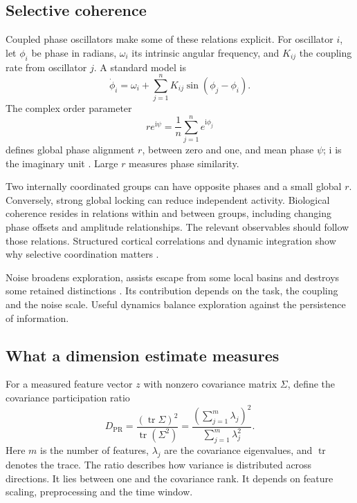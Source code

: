 \documentclass[11pt,a4paper]{article}
\begin{document}
\subsection{Selective coherence}

Coupled phase oscillators make some of these relations explicit. For oscillator \(i\), let \(\phi_i\) be phase in radians, \(\omega_i\) its intrinsic angular frequency, and \(K_{ij}\) the coupling rate from oscillator \(j\). A standard model is
\begin{equation}
 \dot{\phi}_i=\omega_i+\sum_{j=1}^{n}K_{ij}\sin(\phi_j-\phi_i).
 \label{eq:kuramoto}
\end{equation}
The complex order parameter
\begin{equation}
 r e^{\mathrm{i}\psi}=\frac{1}{n}\sum_{j=1}^{n}e^{\mathrm{i}\phi_j}
 \label{eq:order}
\end{equation}
defines global phase alignment \(r\), between zero and one, and mean phase \(\psi\); \(\mathrm{i}\) is the imaginary unit \citep{strogatz2000}. Large \(r\) measures phase similarity.

Two internally coordinated groups can have opposite phases and a small global \(r\). Conversely, strong global locking can reduce independent activity. Biological coherence resides in relations within and between groups, including changing phase offsets and amplitude relationships. The relevant observables should follow those relations. Structured cortical correlations and dynamic integration show why selective coordination matters \citep{hipp2012,shine2019}.

Noise broadens exploration, assists escape from some local basins and destroys some retained distinctions \citep{faisal2008}. Its contribution depends on the task, the coupling and the noise scale. Useful dynamics balance exploration against the persistence of information.

\subsection{What a dimension estimate measures}

For a measured feature vector \(z\) with nonzero covariance matrix \(\Sigma\), define the covariance participation ratio
\begin{equation}
 D_{\mathrm{PR}}=
 \frac{(\operatorname{tr}\Sigma)^2}{\operatorname{tr}(\Sigma^2)}
 =\frac{(\sum_{j=1}^{m}\lambda_j)^2}{\sum_{j=1}^{m}\lambda_j^2}.
 \label{eq:pr}
\end{equation}
Here \(m\) is the number of features, \(\lambda_j\) are the covariance eigenvalues, and \(\operatorname{tr}\) denotes the trace. The ratio describes how variance is distributed across directions. It lies between one and the covariance rank. It depends on feature scaling, preprocessing and the time window.
\end{document}
